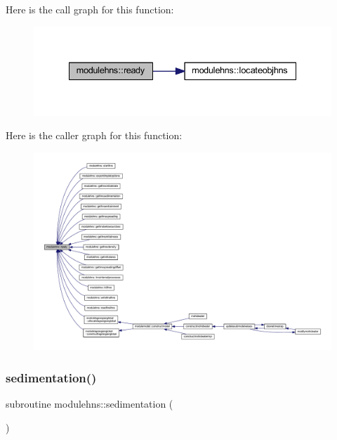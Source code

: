 Here is the call graph for this function\+:\nopagebreak
\begin{figure}[H]
\begin{center}
\leavevmode
\includegraphics[width=335pt]{namespacemodulehns_a1b4bda03d346568b51278fca35b05366_cgraph}
\end{center}
\end{figure}
Here is the caller graph for this function\+:\nopagebreak
\begin{figure}[H]
\begin{center}
\leavevmode
\includegraphics[width=350pt]{namespacemodulehns_a1b4bda03d346568b51278fca35b05366_icgraph}
\end{center}
\end{figure}
\mbox{\label{namespacemodulehns_ab96db95d39d4bc3d33b5266fe71250e6}} 
\subsubsection{\texorpdfstring{sedimentation()}{sedimentation()}}
{\footnotesize\ttfamily subroutine modulehns\+::sedimentation (\begin{DoxyParamCaption}{ }\end{DoxyParamCaption})\hspace{0.3cm}{\ttfamily [private]}}

